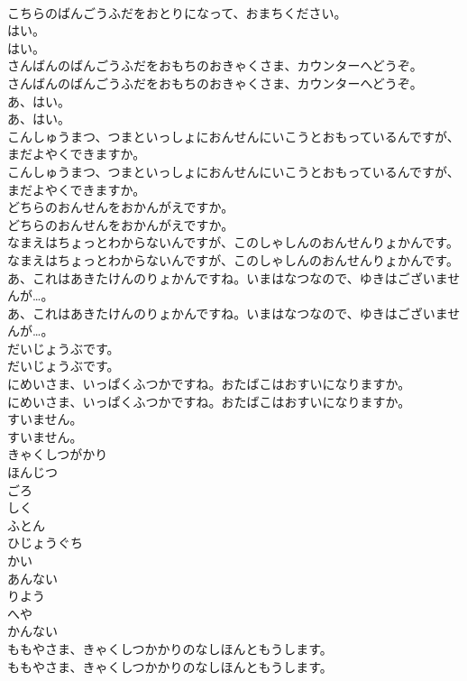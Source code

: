 \documentclass[8pt]{extreport}
\begin{document}
\begin{CJK}{UTF8}{min}
\\	こちらのばんごうふだをおとりになって、おまちください。
\\	はい。
\\	はい。
\\	さんばんのばんごうふだをおもちのおきゃくさま、カウンターへどうぞ。
\\	さんばんのばんごうふだをおもちのおきゃくさま、カウンターへどうぞ。
\\	あ、はい。
\\	あ、はい。
\\	こんしゅうまつ、つまといっしょにおんせんにいこうとおもっているんですが、まだよやくできますか。
\\	こんしゅうまつ、つまといっしょにおんせんにいこうとおもっているんですが、まだよやくできますか。
\\	どちらのおんせんをおかんがえですか。
\\	どちらのおんせんをおかんがえですか。
\\	なまえはちょっとわからないんですが、このしゃしんのおんせんりょかんです。
\\	なまえはちょっとわからないんですが、このしゃしんのおんせんりょかんです。
\\	あ、これはあきたけんのりょかんですね。いまはなつなので、ゆきはございませんが…。
\\	あ、これはあきたけんのりょかんですね。いまはなつなので、ゆきはございませんが…。
\\	だいじょうぶです。
\\	だいじょうぶです。
\\	にめいさま、いっぱくふつかですね。おたばこはおすいになりますか。
\\	にめいさま、いっぱくふつかですね。おたばこはおすいになりますか。
\\	すいません。
\\	すいません。
\\	きゃくしつがかり
\\	ほんじつ
\\	ごろ
\\	しく
\\	ふとん
\\	ひじょうぐち
\\	かい
\\	あんない
\\	りよう
\\	へや
\\	かんない
\\	ももやさま、きゃくしつかかりのなしほんともうします。
\\	ももやさま、きゃくしつかかりのなしほんともうします。

\end{CJK}
\end{document}

